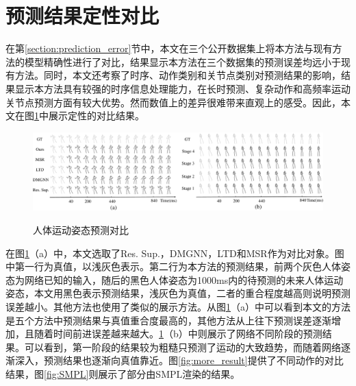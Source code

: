 \section{预测结果定性对比}
在第\ref{section:prediction_error}节中，本文在三个公开数据集上将本方法与现有方法的模型精确性进行了对比，结果显示本方法在三个数据集的预测误差均远小于现有方法。同时，本文还考察了时序、动作类别和关节点类别对预测结果的影响，结果显示本方法具有较强的时序信息处理能力，在长时预测、复杂动作和高频率运动关节点预测方面有较大优势。然而数值上的差异很难带来直观上的感受。因此，本文在图\ref{fig:prediction_result}中展示定性的对比结果。

\begin{figure}[ht]
    \centering
    \includegraphics[width=1\textwidth]{FigMa/prediction_result.pdf}\\
    \vspace{-0.3cm}
    \caption{人体运动姿态预测对比}
    \label{fig:prediction_result}
\end{figure}

在图\ref{fig:prediction_result}（a）中，本文选取了Res. Sup.，DMGNN，LTD和MSR作为对比对象。图中第一行为真值，以浅灰色表示。第二行为本方法的预测结果，前两个灰色人体姿态为网络已知的输入，随后的黑色人体姿态为1000ms内的待预测的未来人体运动姿态，本文用黑色表示预测结果，浅灰色为真值，二者的重合程度越高则说明预测误差越小。其他方法也使用了类似的展示方法。从图\ref{fig:prediction_result}（a）中可以看到本文的方法是五个方法中预测结果与真值重合度最高的，其他方法从上往下预测误差逐渐增加，且随着时间前进误差越来越大。\ref{fig:prediction_result}（b）中则展示了网络不同阶段的预测结果。可以看到，第一阶段的结果较为粗糙只预测了运动的大致趋势，而随着网络逐渐深入，预测结果也逐渐向真值靠近。图\ref{fig:more_result}提供了不同动作的对比结果，图\ref{fig:SMPL}则展示了部分由SMPL\parencite{loper2015smpl}渲染的结果。


